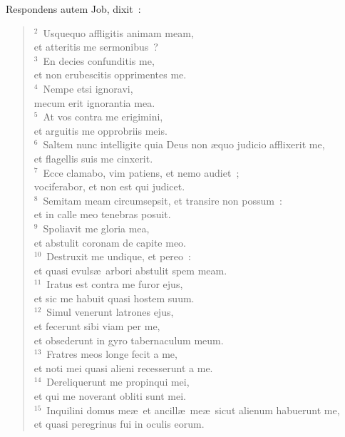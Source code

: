 \lettrine[lines=3,image=true,loversize=0.05,lraise=-0.03]{R}{}espondens autem Job, dixit~:
\begin{flushleft}\begin{verse}\vspace{6pt}${}^{2}$~Usquequo affligitis animam meam,\\ et atteritis me sermonibus~?\\
${}^{3}$~En decies confunditis me,\\ et non erubescitis opprimentes me.\\
${}^{4}$~Nempe etsi ignoravi,\\ mecum erit ignorantia mea.\\
${}^{5}$~At vos contra me erigimini,\\ et arguitis me opprobriis meis.\\
${}^{6}$~Saltem nunc intelligite quia Deus non \ae quo judicio afflixerit me,\\ et flagellis suis me cinxerit.\\
${}^{7}$~Ecce clamabo, vim patiens, et nemo audiet~;\\ vociferabor, et non est qui judicet.\\
${}^{8}$~Semitam meam circumsepsit, et transire non possum~:\\ et in calle meo tenebras posuit.\\
${}^{9}$~Spoliavit me gloria mea,\\ et abstulit coronam de capite meo.\\
${}^{10}$~Destruxit me undique, et pereo~:\\ et quasi evuls\ae\ arbori abstulit spem meam.\\
${}^{11}$~Iratus est contra me furor ejus,\\ et sic me habuit quasi hostem suum.\\
${}^{12}$~Simul venerunt latrones ejus,\\ et fecerunt sibi viam per me,\\ et obsederunt in gyro tabernaculum meum.\\
${}^{13}$~Fratres meos longe fecit a me,\\ et noti mei quasi alieni recesserunt a me.\\
${}^{14}$~Dereliquerunt me propinqui mei,\\ et qui me noverant obliti sunt mei.\\
${}^{15}$~Inquilini domus me\ae\ et ancill\ae\ me\ae\ sicut alienum habuerunt me,\\ et quasi peregrinus fui in oculis eorum.\\

\end{verse}
\end{flushleft}
